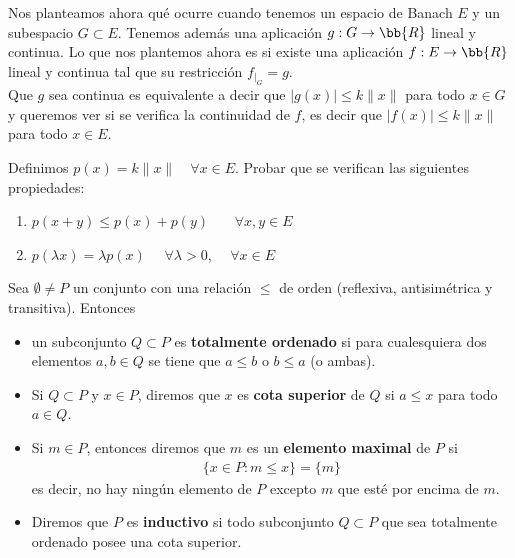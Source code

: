 Nos planteamos ahora qué ocurre cuando tenemos un espacio de Banach $E$ y un subespacio $G\subset E$. Tenemos además una aplicación $g:G\to \bb{R}$ lineal y continua. Lo que nos plantemos ahora es si existe una aplicación $f:E \to \bb{R}$ lineal y continua tal que su restricción $f_{|_G}=g$.\\

Que $g$ sea continua es equivalente a decir que $|g(x)| \leq k \|x\|$ para todo $x\in G$ y queremos ver si se verifica la continuidad de $f$, es decir que $|f(x)| \leq k \|x\|$ para todo $x\in E$.

\begin{ejercicio}
    Definimos $p(x)=k\|x\|$\ \ $\forall x \in E$. Probar que se verifican las siguientes propiedades:
    \begin{enumerate}
        \item $p(x+y) \leq p(x) + p(y)$ \ \ \  $\forall x,y\in E$
        \item $p(\lambda x) = \lambda p(x)$ \ \ $\forall \lambda>0$, \ \ $\forall x \in E$
    \end{enumerate}
\end{ejercicio}


\begin{definicion}
    Sea $\emptyset \neq P$ un conjunto con una relación $\leq$ de orden (reflexiva, antisimétrica y transitiva). Entonces
    \begin{itemize}
        \item un subconjunto $Q\subset P$ es \textbf{totalmente ordenado} si para cualesquiera dos elementos $a,b\in Q$ se tiene que $a\leq b$ o $b\leq a$ (o ambas).
        \item Si $Q\subset P$ y $x\in P$, diremos que $x$ es \textbf{cota superior} de $Q$ si $a\leq x$ para todo $a\in Q$.
        \item Si $m\in P$, entonces diremos que $m$ es un \textbf{elemento maximal} de $P$ si
        \begin{gather*}
            \{x\in P : m\leq x\} = \{m\}
        \end{gather*}
        es decir, no hay ningún elemento de $P$ excepto $m$ que esté por encima de $m$.
        \item Diremos que $P$ es \textbf{inductivo} si todo subconjunto $Q\subset P$ que sea totalmente ordenado posee una cota superior.
    \end{itemize} 
\end{definicion}


